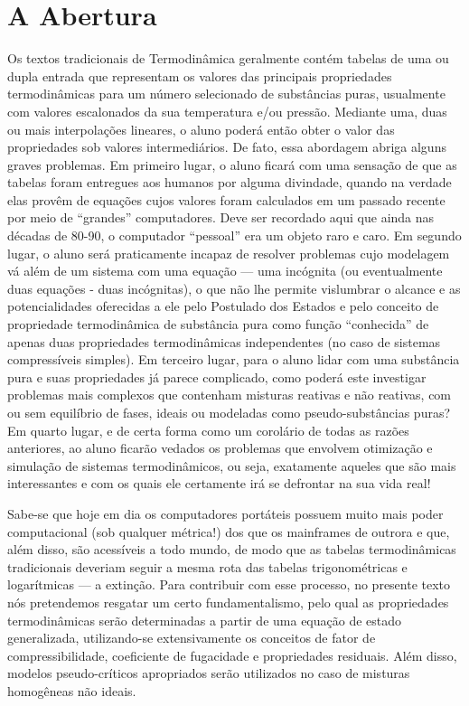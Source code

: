 \chapter*{A Abertura}


    Os textos tradicionais de Termodinâmica geralmente contém tabelas de uma ou
    dupla entrada que representam os valores das principais propriedades
    termodinâmicas para um número selecionado de substâncias puras, usualmente
    com valores escalonados da sua temperatura e/ou pressão. Mediante uma, duas
    ou mais interpolações lineares, o aluno poderá então obter o valor das
    propriedades sob valores intermediários. De fato, essa abordagem abriga
    alguns graves problemas. Em primeiro lugar, o aluno ficará com uma sensação
    de que as tabelas foram entregues aos humanos por alguma divindade, quando
    na verdade elas provêm de equações cujos valores foram calculados em um
    passado recente por meio de \enquote{grandes} computadores. Deve ser
    recordado aqui que ainda nas décadas de 80-90, o computador
    \enquote{pessoal} era um objeto raro e caro. Em segundo lugar, o aluno será
    praticamente incapaz de resolver problemas cujo modelagem vá além de um
    sistema com uma equação --- uma incógnita (ou eventualmente duas equações -
    duas incógnitas), o que não lhe permite vislumbrar o alcance e as
    potencialidades oferecidas a ele pelo Postulado dos Estados e pelo conceito
    de propriedade termodinâmica de substância pura como função
    \enquote{conhecida} de apenas duas propriedades termodinâmicas
    independentes (no caso de sistemas compressíveis simples).  Em terceiro
    lugar, para o aluno lidar com uma substância pura e suas propriedades já
    parece complicado, como poderá este investigar problemas mais complexos que
    contenham misturas reativas e não reativas, com ou sem equilíbrio de fases,
    ideais ou modeladas como pseudo-substâncias puras? Em quarto lugar, e de
    certa forma como um corolário de todas as razões anteriores, ao aluno
    ficarão vedados os problemas que envolvem otimização e simulação de
    sistemas termodinâmicos, ou seja, exatamente aqueles que são mais
    interessantes e com os quais ele certamente irá se defrontar na sua vida
    real!

    Sabe-se que hoje em dia os computadores portáteis possuem muito mais poder
    computacional (sob qualquer métrica!) dos que os mainframes de outrora e
    que, além disso, são acessíveis a todo mundo, de modo que as tabelas
    termodinâmicas tradicionais deveriam seguir a mesma rota das tabelas
    trigonométricas e logarítmicas --- a extinção. Para contribuir com esse
    processo, no presente texto nós pretendemos resgatar um certo
    fundamentalismo, pelo qual as propriedades termodinâmicas serão
    determinadas a partir de uma equação de estado generalizada, utilizando-se
    extensivamente os conceitos de fator de compressibilidade, coeficiente de
    fugacidade e propriedades residuais. Além disso, modelos pseudo-críticos
    apropriados serão utilizados no caso de misturas homogêneas não ideais.

